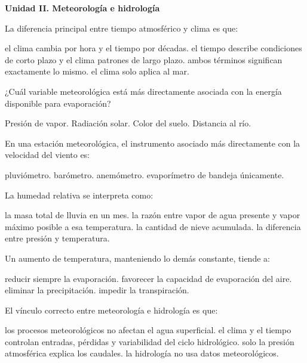 \begin{questions}
\item[]\textbf{Unidad II. Meteorología e hidrología}\par\medskip

\question[2] La diferencia principal entre tiempo atmosférico y clima es
que:
\begin{choices}
  \choice el clima cambia por hora y el tiempo por décadas.
  \CorrectChoice el tiempo describe condiciones de corto plazo y el clima patrones de largo plazo.
  \choice ambos términos significan exactamente lo mismo.
  \choice el clima solo aplica al mar.
\end{choices}

\question[2] ¿Cuál variable meteorológica está más directamente asociada
con la energía disponible para evaporación?
\begin{choices}
  \choice Presión de vapor.
  \CorrectChoice Radiación solar.
  \choice Color del suelo.
  \choice Distancia al río.
\end{choices}

\question[2] En una estación meteorológica, el instrumento asociado más
directamente con la velocidad del viento es:
\begin{choices}
  \choice pluviómetro.
  \choice barómetro.
  \CorrectChoice anemómetro.
  \choice evaporímetro de bandeja únicamente.
\end{choices}

\question[2] La humedad relativa se interpreta como:
\begin{choices}
  \choice la masa total de lluvia en un mes.
  \CorrectChoice la razón entre vapor de agua presente y vapor máximo posible a esa temperatura.
  \choice la cantidad de nieve acumulada.
  \choice la diferencia entre presión y temperatura.
\end{choices}

\question[2] Un aumento de temperatura, manteniendo lo demás constante,
tiende a:
\begin{choices}
  \choice reducir siempre la evaporación.
  \CorrectChoice favorecer la capacidad de evaporación del aire.
  \choice eliminar la precipitación.
  \choice impedir la transpiración.
\end{choices}

\question[3] El vínculo correcto entre meteorología e hidrología es que:
\begin{choices}
  \choice los procesos meteorológicos no afectan el agua superficial.
  \CorrectChoice el clima y el tiempo controlan entradas, pérdidas y variabilidad del ciclo hidrológico.
  \choice solo la presión atmosférica explica los caudales.
  \choice la hidrología no usa datos meteorológicos.
\end{choices}


\end{questions}
